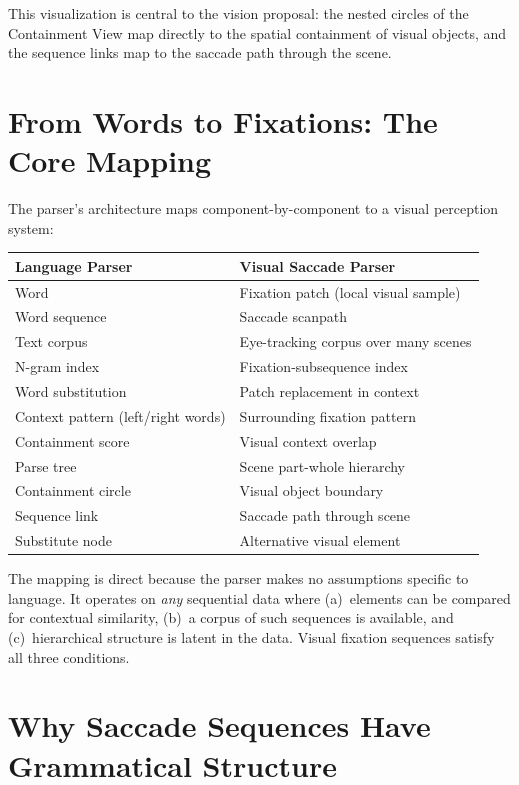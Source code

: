 \documentclass[11pt,a4paper]{article}
\begin{document}
This visualization is central to the vision proposal: the nested circles of the Containment View map directly to the spatial containment of visual objects, and the sequence links map to the saccade path through the scene.

\section{From Words to Fixations: The Core Mapping}

The parser's architecture maps component-by-component to a visual perception system:

\begin{center}
\begin{tabular}{|l|l|}
\hline
\textbf{Language Parser} & \textbf{Visual Saccade Parser} \\
\hline
Word & Fixation patch (local visual sample) \\
Word sequence & Saccade scanpath \\
Text corpus & Eye-tracking corpus over many scenes \\
N-gram index & Fixation-subsequence index \\
Word substitution & Patch replacement in context \\
Context pattern (left/right words) & Surrounding fixation pattern \\
Containment score & Visual context overlap \\
Parse tree & Scene part-whole hierarchy \\
Containment circle & Visual object boundary \\
Sequence link & Saccade path through scene \\
Substitute node & Alternative visual element \\
\hline
\end{tabular}
\end{center}

The mapping is direct because the parser makes no assumptions specific to language. It operates on \textit{any} sequential data where (a)~elements can be compared for contextual similarity, (b)~a corpus of such sequences is available, and (c)~hierarchical structure is latent in the data. Visual fixation sequences satisfy all three conditions.

\section{Why Saccade Sequences Have Grammatical Structure}
\end{document}
